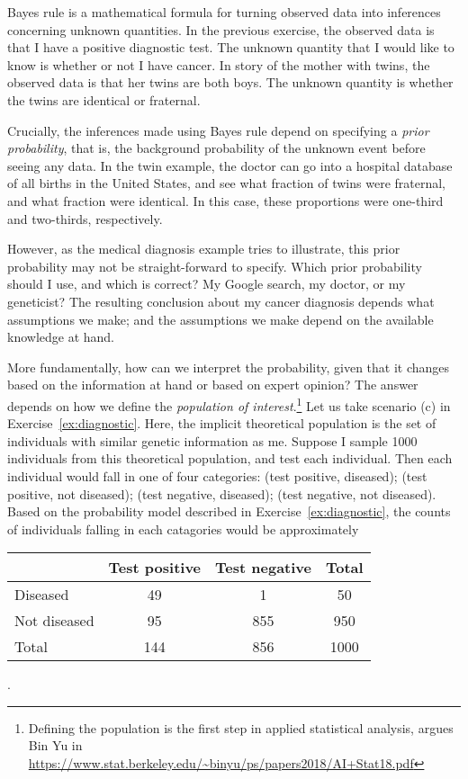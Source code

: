 \documentclass[11pt]{article}
\theoremstyle{definition}
\begin{document}
Bayes rule is a mathematical formula for turning observed data into
inferences concerning unknown quantities.
In the previous exercise, the observed data is that I have a positive diagnostic test.
The unknown quantity that I would like to know is whether or not I have cancer.
In story of the mother with twins, the observed data is that her
twins are both boys. The unknown quantity is whether the twins are identical or fraternal.

Crucially, the inferences made using Bayes rule depend on specifying a \textit{prior probability},
that is, the background probability of the unknown event before seeing any data.
In the twin example, the doctor can go into a hospital database of all births in the United States,
and see what fraction of twins were fraternal, and what fraction were identical.
In this case, these proportions were one-third and two-thirds, respectively.

However, as the medical diagnosis example tries to illustrate, this prior probability
may not be straight-forward to specify. Which prior probability should I use, and which is correct? My Google search, my doctor,
or my geneticist? The resulting conclusion about my cancer diagnosis
depends what assumptions we make; and the assumptions we make depend
on the available knowledge at hand.

More fundamentally, how can we interpret the
probability, given that it changes based on the
information at hand or based on expert opinion?
The answer depends on how we define the \textit{population
of interest}.\footnote{
Defining the population is the
first step in applied statistical analysis,
argues Bin Yu in
\url{https://www.stat.berkeley.edu/~binyu/ps/papers2018/AI+Stat18.pdf}
}
Let us take scenario (c) in Exercise~\ref{ex:diagnostic}.
Here, the implicit theoretical population is the set of
individuals with similar genetic information as me.
Suppose I sample 1000 individuals from this theoretical
population, and test each individual.
Then each individual would fall in one of four categories:
(test positive, diseased); (test positive, not diseased);
(test negative, diseased); (test negative, not diseased).
Based on the probability model described in
Exercise~\ref{ex:diagnostic}, the counts
of individuals falling in each catagories would be
approximately
\begin{table}[!h]
  \centering
  \begin{tabular}{l|cc|c}
    & Test positive & Test negative & Total \\\hline
  Diseased & 49 & 1 & 50 \\
  Not diseased & 95 & 855 & 950\\ \hline
  Total & 144 & 856 & 1000
  \end{tabular}
\end{table}.
\end{document}
